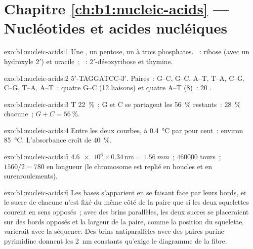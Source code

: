 \section*{Chapitre \ref{ch:b1:nucleic-acids} --- Nucléotides et acides nucléiques}

\begin{solution}{exo:b1:nucleic-acids:1}
Une , un pentose, un à trois phosphates. ~: ribose (avec
un hydroxyle $2'$) et uracile~; ~: $2'$-désoxyribose et thymine.
\end{solution}

\begin{solution}{exo:b1:nucleic-acids:2}
$5'$-TAGGATCC-$3'$. Paires~: G--C, G--C, A--T, T--A, C--G, C--G, T--A,
A--T~: quatre G--C (12 liaisons) et quatre A--T (8)~: 20 .
\end{solution}

\begin{solution}{exo:b1:nucleic-acids:3}
T \qty{22}{\%}~; G et C se partagent les \qty{56}{\%} restants~:
\qty{28}{\%} chacune~; $G + C = \qty{56}{\%}$.
\end{solution}

\begin{solution}{exo:b1:nucleic-acids:4}
Entre les deux courbes, à \qty{0.4}{\celsius} par pour cent~: environ
\qty{85}{\celsius}. L'absorbance croît de \qty{40}{\%}.
\end{solution}

\begin{solution}{exo:b1:nucleic-acids:5}
$\num{4.6e6}\times 0.34\,\mathrm{nm} = \qty{1.56}{mm}$~; \num{460000}
tours~; $1560/2 = 780$ en longueur (le chromosome est replié en boucles
et en surenroulements).
\end{solution}

\begin{solution}{exo:b1:nucleic-acids:6}
Les bases s'apparient en se faisant face par leurs bords, et le sucre de
chacune n'est fixé du même côté de la paire que si les deux squelettes
courent en sens opposés~; avec des brins parallèles, les deux sucres se
placeraient sur des bords opposés et la largeur de la paire, comme la
position du squelette, varierait avec la séquence. Des brins
antiparallèles avec des paires purine--pyrimidine donnent les
\qty{2}{nm} constants qu'exige le diagramme de la fibre.
\end{solution}

